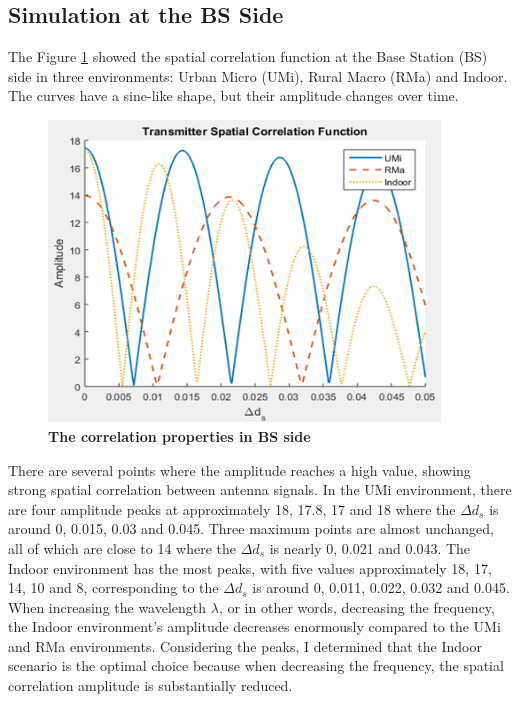 \documentclass{article} %
\begin{document}
\subsection{Simulation at the BS Side}

The Figure \ref{figure2} showed the spatial correlation function at the Base Station (BS) side in three environments: Urban Micro (UMi), Rural Macro (RMa) and Indoor. The curves have a sine-like shape, but their amplitude changes over time.

\begin{figure}[!ht]
    \centering
    \includegraphics[height=8cm]{Images/figure2.png}
    \caption[The correlation properties in BS side~\cite{final_exam}]{\bfseries \fontsize{12pt}{0pt}\selectfont The correlation properties in BS side~\cite{final_exam}}
    \label{figure2}
\end{figure}

There are several points where the amplitude reaches a high value, showing strong spatial correlation between antenna signals. In the UMi environment, there are four amplitude peaks at approximately 18, 17.8, 17 and 18 where the $\Delta d_s$ is around 0, 0.015, 0.03 and 0.045. Three maximum points are almost unchanged, all of which are close to 14 where the $\Delta d_s$ is nearly 0, 0.021 and 0.043. The Indoor environment has the most peaks, with five values approximately 18, 17, 14, 10 and 8, corresponding to the $\Delta d_s$ is around 0, 0.011, 0.022, 0.032 and 0.045. When increasing the wavelength $\lambda$, or in other words, decreasing the frequency, the Indoor environment’s amplitude decreases enormously compared to the UMi and RMa environments. Considering the peaks, I determined that the Indoor scenario is the optimal choice because when decreasing the frequency, the spatial correlation amplitude is substantially reduced.
\end{document}
